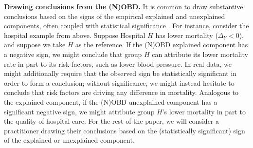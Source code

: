 \textbf{Drawing conclusions from the (N)OBD.}
It is common to draw substantive conclusions based on the signs of the empirical explained and unexplained components, often coupled with
statistical significance \citep{oaxacaRansom1998, jann2008,fortinLemieuxFirpo2011}. For instance, consider the hospital example from above. 
Suppose Hospital $H$ has lower mortality ($\Delta_Y < 0$), and suppose we take $H$ as the reference. 
If the (N)OBD explained component has a negative sign, we might conclude that group $H$ can attribute
its lower mortality rate in part to its risk factors, such as lower blood pressure. In real data, we might additionally require that the observed sign be statistically significant in order to form a conclusion;
without significance, we might
instead hesitate to conclude that risk factors are driving any difference in mortality.
Analogous to the explained component, if the (N)OBD unexplained component has a significant negative sign, we might attribute group $H$'s lower
mortality in part to the quality of hospital care.
For the rest of the paper, we will consider a practitioner drawing their conclusions based on the (statistically significant) sign of the explained or unexplained component.
